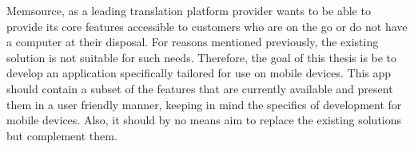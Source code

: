 Memsource, as a leading translation platform provider wants to be able to provide its core features accessible to customers who are on the go or do not have a computer at their disposal. For reasons mentioned previously, the existing solution is not suitable for such needs. Therefore, the goal of this thesis is be to develop an application specifically tailored for use on mobile devices. This app should contain a subset of the features that are currently available and present them in a user friendly manner, keeping in mind the specifics of development for mobile devices. Also, it should by no means aim to replace the existing solutions but complement them.



